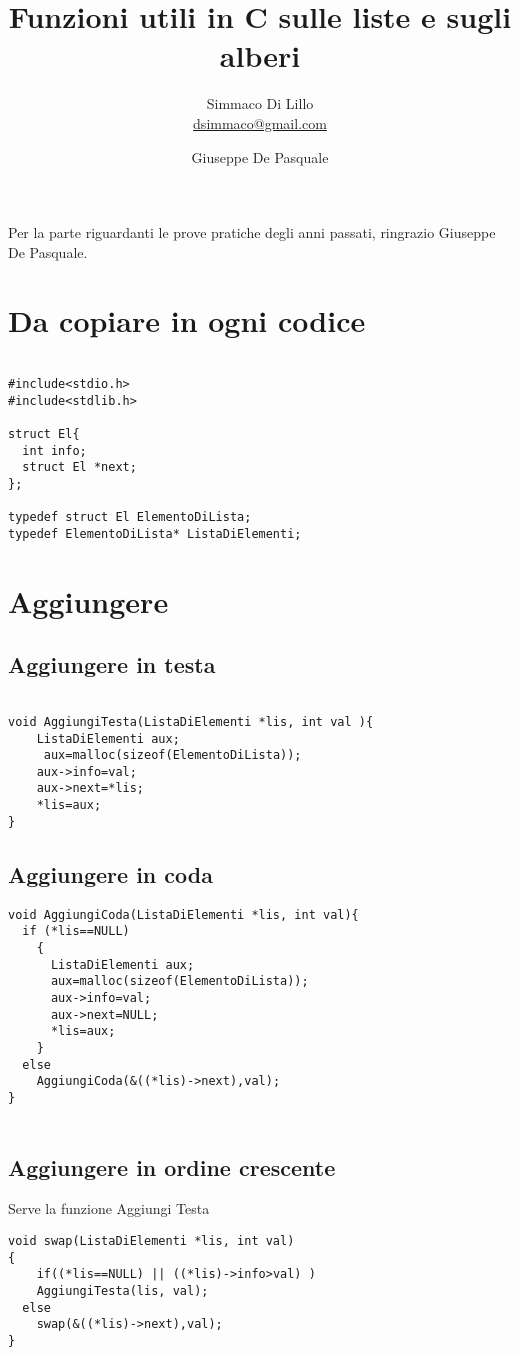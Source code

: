 \documentclass[a4paper,12pt,openany]{book}
\title{Funzioni utili in C sulle liste e sugli alberi }
\author{Simmaco Di Lillo \\ \href{mailto:dsimmaco@.com}{dsimmaco@gmail.com} 
 \and Giuseppe De Pasquale }
\begin{document}
\maketitle
Per la parte riguardanti le prove pratiche degli anni passati, ringrazio Giuseppe  De  Pasquale.\\
\tableofcontents

\chapter{Da copiare in ogni codice}
\begin{lstlisting}

#include<stdio.h>
#include<stdlib.h>

struct El{
  int info;
  struct El *next;
};

typedef struct El ElementoDiLista;
typedef ElementoDiLista* ListaDiElementi;
\end{lstlisting}

\chapter{Aggiungere}

\section{Aggiungere in testa}
\begin{lstlisting}

void AggiungiTesta(ListaDiElementi *lis, int val ){
	ListaDiElementi aux;
	 aux=malloc(sizeof(ElementoDiLista));
 	aux->info=val;
 	aux->next=*lis;
 	*lis=aux;
}
\end{lstlisting}

\section{Aggiungere in coda}
 \begin{lstlisting}
void AggiungiCoda(ListaDiElementi *lis, int val){
  if (*lis==NULL)
    {
      ListaDiElementi aux;
      aux=malloc(sizeof(ElementoDiLista));
      aux->info=val;
      aux->next=NULL;
      *lis=aux;
    }
  else
    AggiungiCoda(&((*lis)->next),val);
}


\end{lstlisting}
\newpage

\section{Aggiungere in ordine crescente}
Serve la funzione Aggiungi Testa 
 \begin{lstlisting}
void swap(ListaDiElementi *lis, int val)
{
    if((*lis==NULL) || ((*lis)->info>val) )
    AggiungiTesta(lis, val);
  else
    swap(&((*lis)->next),val);
}

\end{lstlisting}
\end{document}
